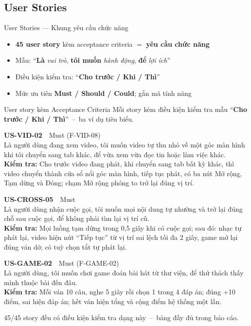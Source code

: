 \subsection{User Stories}
\begin{frame}{User Stories --- Khung yêu cầu chức năng}
\small
\begin{itemize}\setlength{\itemsep}{3pt}
\item \textbf{45 user story} kèm acceptance criteria $=$ \textbf{yêu cầu chức năng}
\item Mẫu: ``\textbf{Là} \textit{vai trò}, \textbf{tôi muốn} \textit{hành động}, \textbf{để} \textit{lợi ích}''
\item Điều kiện kiểm tra: ``\textbf{Cho trước / Khi / Thì}''
\item Mức ưu tiên \textbf{Must / Should / Could}; gắn mã tính năng
\end{itemize}
\end{frame}

\begin{frame}{User story kèm Acceptance Criteria}
\linespread{0.9}
{\tiny\color{TextGray} Mỗi story kèm điều kiện kiểm tra mẫu ``\textbf{Cho trước / Khi / Thì}''~--~ba ví dụ tiêu biểu.}
\vspace{1mm}

{\scriptsize\bfseries\color{BKTemplate} US-VID-02}~~{\tiny Must (F-VID-08)}\\
{\tiny Là người dùng đang xem video, tôi muốn video tự thu nhỏ về một góc màn hình khi tôi chuyển sang tab khác, để vừa xem vừa đọc tin hoặc làm việc khác.}\\
{\tiny\textbf{Kiểm tra:} Cho trước video đang phát, khi chuyển sang tab bất kỳ khác, thì video chuyển thành cửa sổ nổi góc màn hình, tiếp tục phát, có ba nút Mở rộng, Tạm dừng và Đóng; chạm Mở rộng phóng to trở lại đúng vị trí.}

\vspace{2mm}
{\scriptsize\bfseries\color{BKTemplate} US-CROSS-05}~~{\tiny Must}\\
{\tiny Là người dùng nhận cuộc gọi, tôi muốn mọi nội dung tự nhường và trở lại đúng chỗ sau cuộc gọi, để không phải tìm lại vị trí cũ.}\\
{\tiny\textbf{Kiểm tra:} Mọi luồng tạm dừng trong 0,5 giây khi có cuộc gọi; sau đó: nhạc tự phát lại, video hiện nút ``Tiếp tục'' từ vị trí sai lệch tối đa 2 giây, game mở lại đúng ván dở; có tuỳ chọn tắt tự phát lại.}

\vspace{2mm}
{\scriptsize\bfseries\color{BKTemplate} US-GAME-02}~~{\tiny Must (F-GAME-02)}\\
{\tiny Là người dùng, tôi muốn chơi game đoán bài hát từ thư viện, để thử thách thấy mình thuộc bài đến đâu.}\\
{\tiny\textbf{Kiểm tra:} Mỗi ván 10 câu, nghe 5 giây rồi chọn 1 trong 4 đáp án; đúng +10 điểm, sai hiện đáp án; hết ván hiện tổng và cộng điểm hệ thống một lần.}

\vfill
{\tiny\color{TextGray} 45/45 story đều có điều kiện kiểm tra dạng này~--~bảng đầy đủ trong báo cáo.}
\end{frame}

